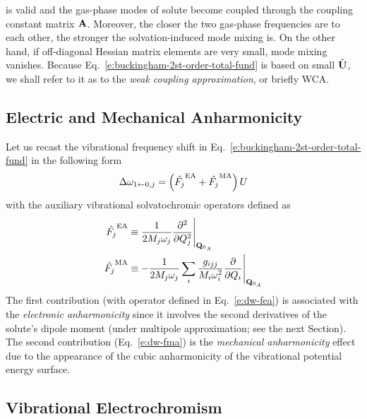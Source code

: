 \documentclass[a4paper,titlepage,twoside,fleqn,12pt]{book}
\begin{document}
\begin{refsection}
is valid and the gas\hyp{}phase modes of solute become coupled
through the coupling constant matrix $\bf A$. Moreover, the closer
the two gas\hyp{}phase frequencies are to each other, the stronger the solvation\hyp{}induced
mode mixing is. On the other hand, if off\hyp{}diagonal Hessian matrix elements are
very small, mode mixing vanishes. Because Eq.~\eqref{e:buckingham-2st-order-total-fund}
is based on small $\tilde{\bf U}$, we shall refer to it
as to the \emph{weak coupling approximation}, or briefly WCA.

\subsection{Electric and Mechanical Anharmonicity\label{s:ea-mea}}

Let us recast the vibrational frequency shift in Eq.~\eqref{e:buckingham-2st-order-total-fund}
in the following form
%
\begin{equation} 
 \Delta\omega_{1\leftarrow 0,j} = \left( \hat{F_j}^{\rm EA} + \hat{F_j}^{\rm MA}\right) U
\end{equation}
%
with the auxiliary vibrational solvatochromic operators defined as
%
\begin{subequations} \label{e:dw-fea-fma}
 \begin{align}
  \hat{F_j}^{\rm EA} &\equiv  \frac{1}{2M_j\omega_j} \frac{\partial^2}{\partial Q_j^2} \Bigg|_{{\bf Q}_{0_A}} 
         \label{e:dw-fea}\\
  \hat{F_j}^{\rm MA} &\equiv -\frac{1}{2M_j\omega_j} 
             \sum_i \frac{g_{ijj}}{M_i\omega_i^2} \frac{\partial}{\partial Q_i} \Bigg|_{{\bf Q}_{0_A}} 
         \label{e:dw-fma}
 \end{align}
\end{subequations}
%
The first contribution (with operator defined in Eq.~\eqref{e:dw-fea}) 
is associated with the \emph{electronic anharmonicity}
since it involves the second derivatives of the solute's dipole
moment (under multipole approximation; see the next Section). 
The second contribution (Eq.~\eqref{e:dw-fma})
is the \emph{mechanical anharmonicity} effect due to the appearance of the 
cubic anharmonicity of the vibrational potential energy surface.

\subsection{Vibrational Electrochromism\label{s:vibr-electrochromism}}


\end{refsection}
\end{document}

